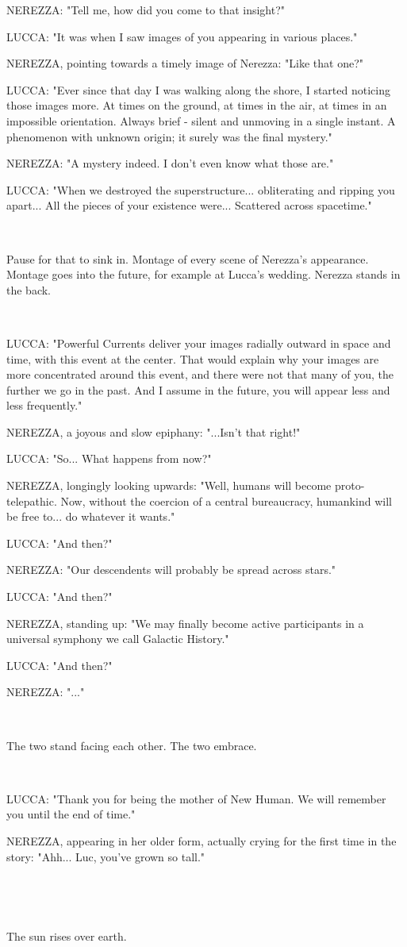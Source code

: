 \documentclass[11pt]{article}
\begin{document}
NEREZZA: "Tell me, how did you come to that insight?"

LUCCA: "It was when I saw images of you appearing in various places."

NEREZZA, pointing towards a timely image of Nerezza: "Like that one?"

LUCCA: "Ever since that day I was walking along the shore, I started noticing those images more.
At times on the ground, at times in the air, at times in an impossible orientation. 
Always brief - silent and unmoving in a single instant.
A phenomenon with unknown origin; it surely was the final mystery."

NEREZZA: "A mystery indeed. 
I don't even know what those are."

LUCCA: "When we destroyed the superstructure... obliterating and ripping you apart...
All the pieces of your existence were... 
Scattered across spacetime."

\ 

Pause for that to sink in.
Montage of every scene of Nerezza's appearance.
Montage goes into the future, for example at Lucca's wedding.
Nerezza stands in the back.

\ 

LUCCA: "Powerful Currents deliver your images radially outward in space and time, with this event at the center.
That would explain why your images are more concentrated around this event, and there were not that many of you, the further we go in the past.
And I assume in the future, you will appear less and less frequently."

NEREZZA, a joyous and slow epiphany: "...Isn't that right!"

LUCCA: "So... What happens from now?"

NEREZZA, longingly looking upwards: "Well, humans will become proto-telepathic. 
Now, without the coercion of a central bureaucracy, humankind will be free to... do whatever it wants."

LUCCA: "And then?"

NEREZZA: "Our descendents will probably be spread across stars."

LUCCA: "And then?"

NEREZZA, standing up: "We may finally become active participants in a universal symphony we call Galactic History."

LUCCA: "And then?"

NEREZZA: "..."

\ 

The two stand facing each other.
The two embrace. 

\ 

LUCCA: "Thank you for being the mother of New Human.
We will remember you until the end of time."

NEREZZA, appearing in her older form, actually crying for the first time in the story: "Ahh... Luc, you've grown so tall."

\ 

\ 

The sun rises over earth.
\end{document}
